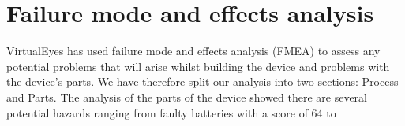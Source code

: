 \section{Failure mode and effects analysis}
VirtualEyes has used failure mode and effects analysis (FMEA) to assess any potential problems that will arise whilst building the device and problems with the device's parts. We have therefore split our analysis into two sections: Process and Parts. 
The analysis of the parts of the device showed there are several potential hazards ranging from faulty batteries with a score of 64 to 